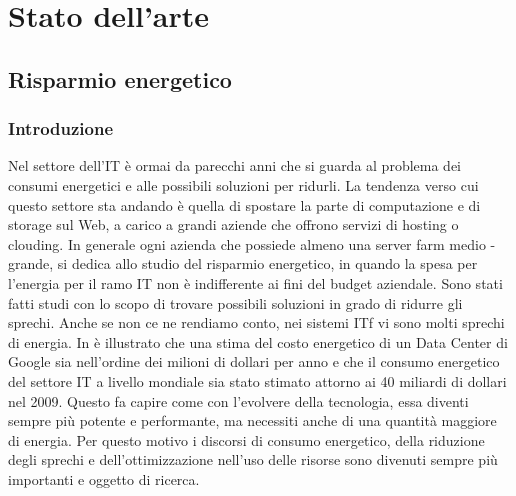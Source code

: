 \chapter{Stato dell'arte}
\label{chap:Stato dell'arte}

\section{Risparmio energetico}
\subsection{Introduzione}
Nel settore dell'\acf{IT} è ormai da parecchi anni che si guarda al problema dei consumi energetici e alle possibili soluzioni per ridurli. La tendenza verso cui questo settore sta andando è quella di spostare la parte di computazione e di storage sul Web, a carico a grandi aziende che offrono servizi di hosting o clouding. In generale ogni azienda che possiede almeno una server farm medio - grande, si dedica allo studio del risparmio energetico, in quando la spesa per l'energia per il ramo \acs{IT} non è indifferente ai fini del budget aziendale. Sono stati fatti studi con lo scopo di trovare possibili soluzioni in grado di ridurre gli sprechi. Anche se non ce ne rendiamo conto, nei sistemi \acs{IT}f vi sono molti sprechi di energia. In \cite{ranganathan2010-pac} è illustrato che una stima del costo energetico di un Data Center di Google sia nell'ordine dei milioni di dollari per anno e che il consumo energetico del settore \acs{IT} a livello mondiale sia stato stimato attorno ai 40 miliardi di dollari nel 2009. Questo fa capire come con l'evolvere della tecnologia, essa diventi sempre più potente e performante, ma necessiti anche di una quantità maggiore di energia. Per questo motivo i discorsi di consumo energetico, della riduzione degli sprechi e dell'ottimizzazione nell'uso delle risorse sono divenuti sempre più importanti e oggetto di ricerca.

